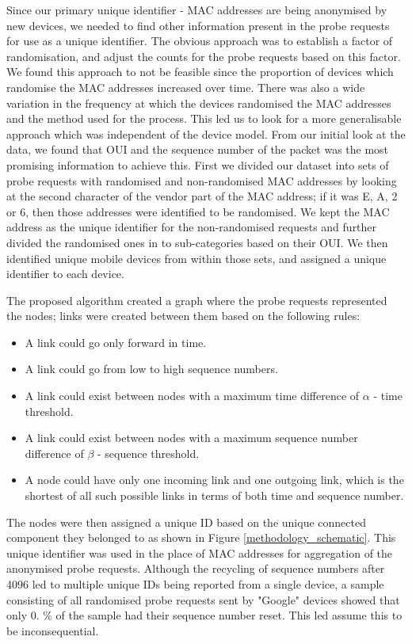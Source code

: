 Since our primary unique identifier - MAC addresses are being anonymised by new devices, we needed to find other information present in the probe requests for use as a unique identifier.
The obvious approach was to establish a factor of randomisation, and adjust the counts for the probe requests based on this factor.
We found this approach to not be feasible since the proportion of devices which randomise the MAC addresses increased over time.
There was also a wide variation in the frequency at which the devices randomised the MAC addresses and the method used for the process.
This led us to look for a more generalisable approach which was independent of the device model.
From our initial look at the data, we found that OUI and the sequence number of the packet was the most promising information to achieve this.
First we divided our dataset into sets of probe requests with randomised and non-randomised MAC addresses by looking at the second character of the vendor part of the MAC address; if it was E, A, 2 or 6, then those addresses were identified to be randomised.
We kept the MAC address as the unique identifier for the non-randomised requests and further divided the randomised ones in to sub-categories based on their OUI.
We then  identified unique mobile devices from within those sets, and assigned a unique identifier to each device.

The proposed algorithm created a graph where the probe requests represented the nodes; links were created between them based on the following rules:

\begin{itemize} 
  \item A link could go only forward in time.
  \item A link could go from low to high sequence numbers. 
  \item A link could exist between nodes with a maximum time difference of $\alpha$ - time threshold.
  \item A link could exist between nodes with a maximum sequence number difference of $\beta$ - sequence threshold.
  \item A node could have only one incoming link and one outgoing link, which is the shortest of all such possible links in terms of both time and sequence number.
\end{itemize}

The nodes were then assigned a unique ID based on the unique connected component they belonged to as shown in Figure \ref{methodology_schematic}.
This unique identifier was used in the place of MAC addresses for aggregation of the anonymised probe requests.
Although the recycling of sequence numbers after 4096 led to multiple unique IDs being reported from a single device, a sample consisting of all randomised probe requests sent by "Google" devices showed that only 0.
\% of the sample had their sequence number reset.
This led assume this to be inconsequential.

